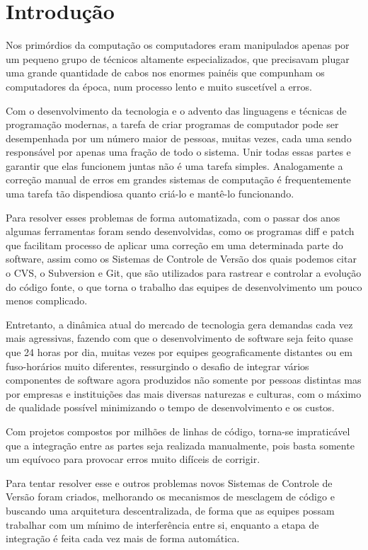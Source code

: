 \chapter{Introdução}

Nos primórdios da computação os computadores eram manipulados apenas por um
pequeno grupo de técnicos altamente especializados, que precisavam plugar uma
grande quantidade de cabos nos enormes painéis que compunham os computadores da
época, num processo lento e muito suscetível a erros.

Com o desenvolvimento da tecnologia e o advento das linguagens e técnicas de programação
modernas, a tarefa de criar programas de computador pode ser desempenhada por um número maior
de pessoas, muitas vezes, cada uma sendo responsável por apenas uma fração de todo o sistema.
Unir todas essas partes e garantir que elas funcionem juntas não é uma tarefa simples.
Analogamente a correção manual de erros em grandes sistemas de computação é frequentemente
uma tarefa tão dispendiosa quanto criá-lo e mantê-lo funcionando.

Para resolver esses problemas de forma automatizada, com o passar dos anos algumas
ferramentas foram sendo desenvolvidas, como os programas diff e patch que facilitam processo de
aplicar uma correção em uma determinada parte do software, assim como os Sistemas de Controle
de Versão dos quais podemos citar o CVS, o Subversion e Git,
que são utilizados para rastrear e
controlar a evolução do código fonte, o que torna o trabalho das equipes de desenvolvimento um
pouco menos complicado.

Entretanto, a dinâmica atual do mercado de tecnologia gera demandas cada vez mais
agressivas, fazendo com que o desenvolvimento de software seja feito quase que 24 horas por dia,
muitas vezes por equipes geograficamente distantes ou em fuso-horários muito diferentes,
ressurgindo o desafio de integrar vários componentes de software agora produzidos não somente por
pessoas distintas mas por empresas e instituições das mais diversas naturezas e culturas, com o
máximo de qualidade possível minimizando o tempo de desenvolvimento e os custos.

Com projetos compostos por milhões de linhas de código, torna-se impraticável que a
integração entre as partes seja realizada manualmente, pois basta somente um equívoco para
provocar erros muito difíceis de corrigir.

Para tentar resolver esse e outros problemas novos Sistemas de Controle de Versão foram
criados, melhorando os mecanismos de mesclagem de código e buscando uma arquitetura
descentralizada, de forma que as equipes possam trabalhar com um mínimo de interferência entre si,
enquanto a etapa de integração é feita cada vez mais de forma automática.


